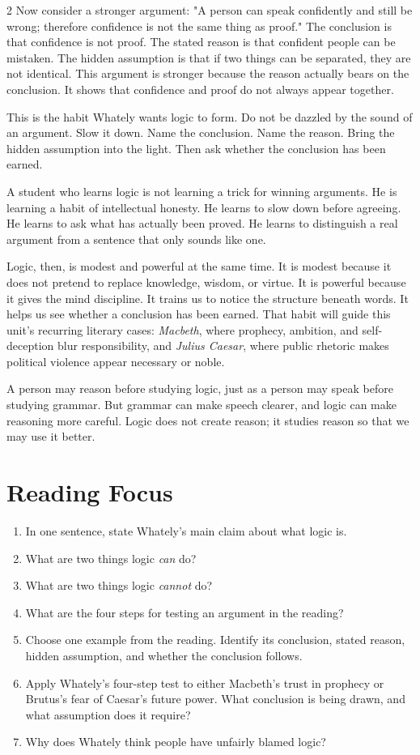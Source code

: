 \documentclass[12pt]{article}
\begin{document}
\begin{multicols}{2}
Now consider a stronger argument: "A person can speak confidently and still be wrong; therefore confidence is not the same thing as proof." The conclusion is that confidence is not proof. The stated reason is that confident people can be mistaken. The hidden assumption is that if two things can be separated, they are not identical. This argument is stronger because the reason actually bears on the conclusion. It shows that confidence and proof do not always appear together.

This is the habit Whately wants logic to form. Do not be dazzled by the sound of an argument. Slow it down. Name the conclusion. Name the reason. Bring the hidden assumption into the light. Then ask whether the conclusion has been earned.

A student who learns logic is not learning a trick for winning arguments. He is learning a habit of intellectual honesty. He learns to slow down before agreeing. He learns to ask what has actually been proved. He learns to distinguish a real argument from a sentence that only sounds like one.

Logic, then, is modest and powerful at the same time. It is modest because it does not pretend to replace knowledge, wisdom, or virtue. It is powerful because it gives the mind discipline. It trains us to notice the structure beneath words. It helps us see whether a conclusion has been earned. That habit will guide this unit's recurring literary cases: \textit{Macbeth}, where prophecy, ambition, and self-deception blur responsibility, and \textit{Julius Caesar}, where public rhetoric makes political violence appear necessary or noble.

A person may reason before studying logic, just as a person may speak before studying grammar. But grammar can make speech clearer, and logic can make reasoning more careful. Logic does not create reason; it studies reason so that we may use it better.

\section*{Reading Focus}
\begin{enumerate}[leftmargin=*]
\item In one sentence, state Whately's main claim about what logic is.
\item What are two things logic \textit{can} do?
\item What are two things logic \textit{cannot} do?
\item What are the four steps for testing an argument in the reading?
\item Choose one example from the reading. Identify its conclusion, stated reason, hidden assumption, and whether the conclusion follows.
\item Apply Whately's four-step test to either Macbeth's trust in prophecy or Brutus's fear of Caesar's future power. What conclusion is being drawn, and what assumption does it require?
\item Why does Whately think people have unfairly blamed logic?
\end{enumerate}


\end{multicols}
\end{document}
